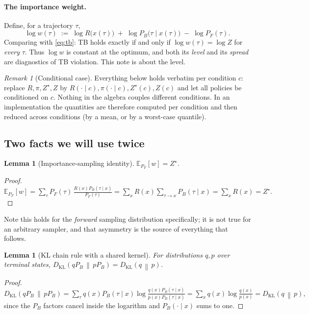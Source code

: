 \documentclass[11pt]{article}
\theoremstyle{plain}
\newtheorem{lemma}[theorem]{Lemma}
\theoremstyle{definition}
\theoremstyle{remark}
\newtheorem{remark}[theorem]{Remark}
\newcommand{\KL}[2]{D_{\mathrm{KL}}\!\left(#1 \,\middle\|\, #2\right)}
\newcommand{\E}[2]{\mathbb{E}_{#1}\!\left[#2\right]}
\newcommand{\PF}{P_{F}}
\newcommand{\PB}{P_{B}}
\newcommand{\Zstar}{Z^{\star}}
\begin{document}
\paragraph{The importance weight.}
Define, for a trajectory $\tau$,
\begin{equation}\label{eq:logw}
  \log w(\tau) \;:=\; \log R\bigl(x(\tau)\bigr) \;+\; \log \PB\bigl(\tau\mid x(\tau)\bigr) \;-\; \log \PF(\tau).
\end{equation}
Comparing with \eqref{eq:tb}: TB holds exactly if and only if $\log w(\tau) = \log Z$
for \emph{every} $\tau$. Thus $\log w$ is constant at the optimum, and both its
\emph{level} and its \emph{spread} are diagnostics of TB violation. This note is
about the level.

\begin{remark}[Conditional case]
Everything below holds verbatim per condition $c$: replace $R, \pi, \Zstar, Z$ by
$R(\cdot\mid c), \pi(\cdot\mid c), \Zstar(c), Z(c)$ and let all policies be
conditioned on $c$. Nothing in the algebra couples different conditions. In an
implementation the quantities are therefore computed per condition and then
reduced across conditions (by a mean, or by a worst-case quantile).
\end{remark}

\subsection{Two facts we will use twice}

\begin{lemma}[Importance-sampling identity]\label{lem:is}
$\E{\PF}{w} = \Zstar$.
\end{lemma}
\begin{proof}
$\displaystyle \E{\PF}{w} = \sum_\tau \PF(\tau)\,\frac{R(x)\PB(\tau\mid x)}{\PF(\tau)}
 = \sum_x R(x)\!\!\sum_{\tau \to x}\!\!\PB(\tau\mid x) = \sum_x R(x) = \Zstar.$
\end{proof}

\noindent
Note this holds for the \emph{forward} sampling distribution specifically; it is
not true for an arbitrary sampler, and that asymmetry is the source of everything
that follows.

\begin{lemma}[KL chain rule with a shared kernel]\label{lem:chain}
For distributions $q, p$ over terminal states, $\KL{q\PB}{p\PB} = \KL{q}{p}$.
\end{lemma}
\begin{proof}
$\displaystyle \KL{q\PB}{p\PB} = \sum_\tau q(x)\PB(\tau\mid x)\log\frac{q(x)\PB(\tau\mid x)}{p(x)\PB(\tau\mid x)}
= \sum_x q(x) \log\frac{q(x)}{p(x)} = \KL{q}{p},$
since the $\PB$ factors cancel inside the logarithm and $\PB(\cdot\mid x)$ sums to one.
\end{proof}
\end{document}
